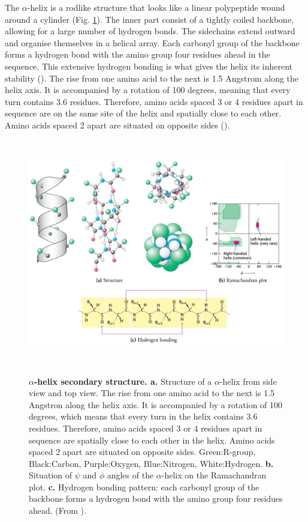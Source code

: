 The $\alpha$-helix is a rodlike structure that looks like a linear polypeptide wound around a cylinder (Fig. \ref{fig:helix}). 
The inner part consist of a tightly coiled backbone, 
allowing for a large number of hydrogen bonds. 
The sidechains extend outward and organise themselves in a helical array. 
Each carbonyl group of the backbone forms a hydrogen bond with the amino group four residues ahead in the sequence. 
This extensive hydrogen bonding is what gives the helix its inherent stability 
(\cite{madigan2015}).
The rise from one amino acid to the next is 1.5 Angstrom along the helix axis. 
It is accompanied by a rotation of 100 degrees, meaning that every turn contains 3.6 residues. 
Therefore, amino acids spaced 3 or 4 residues apart in sequence are on the same site of the helix 
and spatially close to each other. 
Amino acids spaced 2 apart are situated on opposite sides 
(\cite{berg2015}).

~\begin{figure}[h!]
	\centering
	\includegraphics[width=\linewidth]{./literature_review/proteins/secundary_structure/helix/img/helix.png}
	\caption{
		\textbf{$\alpha$-helix secondary structure. a.}
		Structure of a $\alpha$-helix from side view and top view. 
		The rise from one amino acid to the next is 1.5 Angstron along the helix axis. 
		It is accompanied by a rotation of 100 degrees, 
		which means that every turn in the helix contains 3.6 residues. 
		Therefore, amino acids spaced 3 or 4 residues apart in sequence are spatially close to each other in the helix. 
		Amino acids spaced 2 apart are situated on opposite sides. 
		Green:R-group, 
		Black:Carbon, 
		Purple:Oxygen,
		Blue:Nitrogen, 
		White:Hydrogen.
			\textbf{b.}
		Situation of $\psi$ and $\phi$ angles of the $\alpha$-helix on the Ramachandran plot.
			\textbf{c.}
		Hydrogen bonding pattern: 
		each carbonyl group of the backbone forms a hydrogen bond with the amino group four residues ahead.
		(From \cite{berg2015}).
	}
	\label{fig:helix}
~\end{figure}
